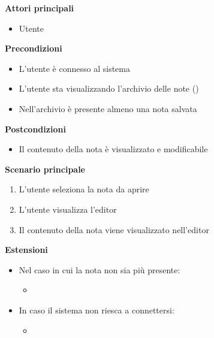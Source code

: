 \documentclass[a4paper,10pt]{article}
\begin{document}
    \textbf{Attori principali}
    \begin{itemize}
        \item Utente
    \end{itemize}
    \textbf{Precondizioni}
    \begin{itemize}
        \item L'utente è connesso al sistema
        \item L'utente sta visualizzando l'archivio delle note ()
        \item Nell'archivio è presente almeno una nota salvata
    \end{itemize}
    \textbf{Postcondizioni}
    \begin{itemize}
        \item Il contenuto della nota è visualizzato e modificabile
    \end{itemize}
    \textbf{Scenario principale}
    \begin{enumerate}
        \item L'utente seleziona la nota da aprire
        \item L'utente visualizza l'editor
        \item Il contenuto della nota viene visualizzato nell'editor
    \end{enumerate}
    \textbf{Estensioni}
    \begin{itemize}
        \item Nel caso in cui la nota non sia più presente:
        \begin{itemize}
            \item {}
        \end{itemize}
        \item In caso il sistema non riesca a connettersi:
        \begin{itemize}
            \item {}
        \end{itemize}
    \end{itemize}
\end{document}
